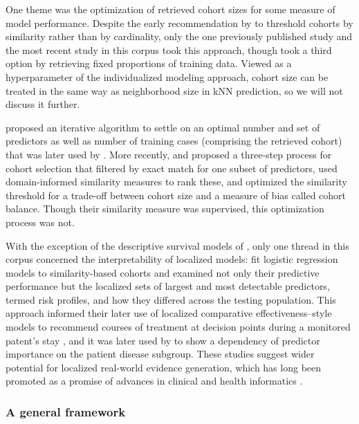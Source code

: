 \documentclass[sn-mathphys,Numbered,pdflatex]{sn-jnl}
\theoremstyle{remark}
\theoremstyle{definition}
\newcommand{\hl}[1]{#1}
\begin{document}
\hl{One theme} was the optimization of retrieved cohort sizes for some
measure of model performance. Despite the early recommendation by
\citet{Park2006} to threshold cohorts by similarity rather than by
cardinality, only the one previously published study
\citep{Mariuzzi1997} and the most recent study \citep{Tang2021, Ng2021}
in this corpus took this approach, though \citet{Liu2022} took a third
option by retrieving fixed proportions of training data. Viewed as a
hyperparameter of the individualized modeling approach, cohort size can
be treated in the same way as neighborhood size in \hl{kNN}
\hl{prediction}, so we will not discuss it further.

\citet{Kasabov2010} proposed an iterative algorithm to settle on an
optimal number and set of predictors as well as number of training cases
(comprising the retrieved cohort) that was later used by
\citet{Liang2015}. More recently, \citet{Tang2021} and \citet{Ng2021}
proposed a three-step process for cohort selection that filtered by
exact match for one subset of predictors, used domain-informed
similarity measures to rank these, and optimized the similarity
threshold for a trade-off between cohort size and a measure of bias
called cohort balance. \hl{T}hough their similarity measure was
supervised, this optimization process was not.

With the exception of the descriptive survival models of
\citet{Mariuzzi1997}, only one thread in this corpus \hl{concerned the}
interpretability of localized models: \citet{Ng2015} fit logistic
regression models to similarity-based cohorts and examined not only
their predictive performance but the localized sets of largest and most
detectable predictors, termed risk profiles, and how they differed
across the testing population. This approach informed their later use of
localized comparative effectiveness--style models to recommend courses
of treatment at decision points during a monitored patent's stay
\citep{Tang2021, Ng2021}, and it was later used by \citet{Liu2022} to
show a dependency of predictor importance on the patient disease
subgroup. These studies suggest \hl{wider} potential for localized
real-world evidence generation, which has long been promoted as a
promise of advances in clinical and health informatics
\citep{Longhurst2014}.

\subsubsection{A general framework}\label{a-general-framework}
\end{document}
